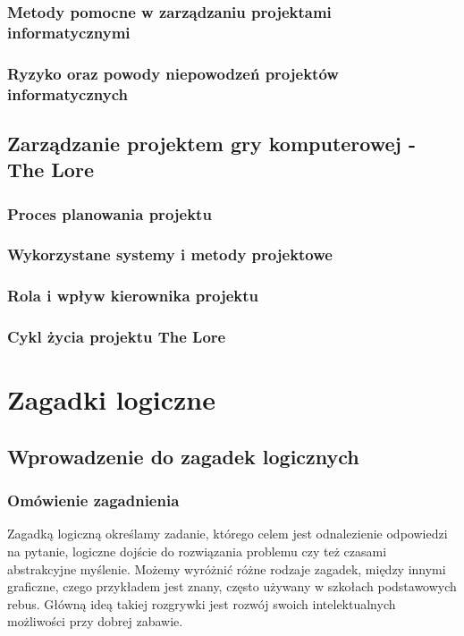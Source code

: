 \documentclass[oneside,polski,logo]{amuthesis}
\begin{document}
\subsection{Metody pomocne w zarządzaniu projektami informatycznymi}
\subsection{Ryzyko oraz powody niepowodzeń  projektów informatycznych}

\section{Zarządzanie projektem gry komputerowej - The Lore}
\subsection{Proces planowania projektu}
\subsection{Wykorzystane systemy i metody projektowe}
\subsection{Rola i wpływ kierownika projektu} 
\subsection{Cykl życia projektu The Lore}

\chapter{Zagadki logiczne}
\section{Wprowadzenie do zagadek logicznych}
\subsection{Omówienie zagadnienia}
Zagadką logiczną określamy zadanie, którego celem jest odnalezienie odpowiedzi na pytanie, logiczne dojście do rozwiązania problemu czy też czasami abstrakcyjne myślenie. Możemy wyróżnić różne rodzaje zagadek, między innymi graficzne, czego przykładem jest znany, często używany w szkołach podstawowych rebus. Główną ideą takiej rozgrywki jest rozwój swoich intelektualnych możliwości przy dobrej zabawie. \cite{zagadka_logiczna}
\end{document}
